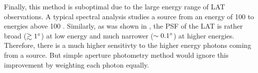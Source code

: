 Finally, this method is suboptimal due to the large energy range of
LAT observations.  A typical spectral analysis studies a source from
an energy of 100 \mev to energies above 100 \gev.  Similarly, as was
shown in , the PSF
of the LAT is rather broad ($\gtrsim 1^\circ$) at low energy and much
narrower ($\sim 0.1^\circ$) at higher energies. Therefore, there is a
much higher sensitivty to the higher energy photons coming from a source.
But simple aperture photometry method would ignore this improvement by
weighting each photon equally.

